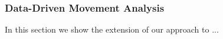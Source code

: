 
\subsubsection{Data-Driven Movement Analysis}
\label{sec:DataDrivenMovementAnalysis}

In this section we show the extension of our approach to ...